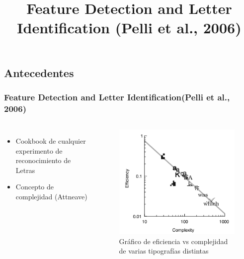 \documentclass{beamer}
\begin{document}
\subsection{Antecedentes}
\begin{frame}
\frametitle{Feature Detection and Letter Identification(Pelli et al., 2006)}
\begin{columns}[t]
\title{Feature Detection and Letter Identification (Pelli et al., 2006)}
\begin{itemize}
 \item Cookbook de cualquier experimento de reconocimiento de Letras
 \item Concepto de complejidad (Attneave)
\end{itemize}



\begin{figure}
 \includegraphics[width=\textwidth]{graficos/pelli4.png}
\caption{Gráfico de eficiencia vs complejidad de varias tipografías distintas}
\end{figure}

\end{columns}
\end{frame}
\end{document}
